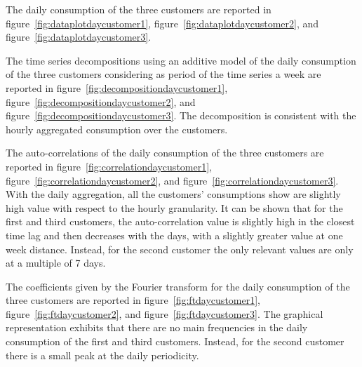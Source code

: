 The daily consumption of the three customers are reported in figure~\ref{fig:dataplotdaycustomer1}, figure~\ref{fig:dataplotdaycustomer2}, and figure~\ref{fig:dataplotdaycustomer3}.

The time series decompositions using an additive model of the daily consumption of the three customers considering as period of the time series a week are reported in figure~\ref{fig:decompositiondaycustomer1}, figure~\ref{fig:decompositiondaycustomer2}, and figure~\ref{fig:decompositiondaycustomer3}.
The decomposition is consistent with the hourly aggregated consumption over the customers.

The auto-correlations of the daily consumption of the three customers are reported in figure~\ref{fig:correlationdaycustomer1},  figure~\ref{fig:correlationdaycustomer2}, and  figure~\ref{fig:correlationdaycustomer3}.
With the daily aggregation, all the customers’ consumptions show are slightly high value with respect to the hourly granularity.
It can be shown that for the first and third customers, the auto-correlation value is slightly high in the closest time lag and then decreases with the days, with a slightly greater value at one week distance.
Instead, for the second customer the only relevant values are only at a multiple of 7 days.

The coefficients given by the Fourier transform for the daily consumption of the three customers are reported in figure~\ref{fig:ftdaycustomer1}, figure~\ref{fig:ftdaycustomer2}, and figure~\ref{fig:ftdaycustomer3}.
The graphical representation exhibits that there are no main frequencies in the daily consumption of the first and third customers.
Instead, for the second customer there is a small peak at the daily periodicity.

